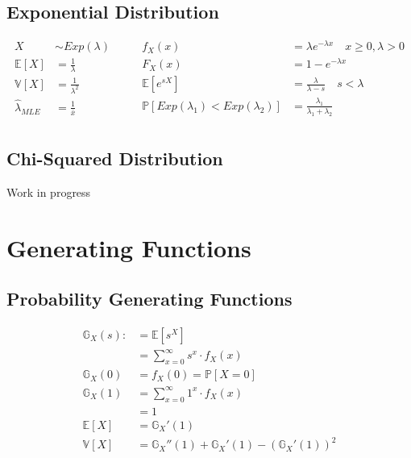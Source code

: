 \documentclass[12pt]{article}
\begin{document}
    \subsection{Exponential Distribution}
    \begin{equation*}
        \begin{aligned}
            X &\sim Exp(\lambda) \qquad\\
            \mathbb{E}[X] &= \frac{1}{\lambda} \\
            \mathbb{V}[X] &= \frac{1}{\lambda^2} \\
            \hat{\lambda}_{MLE} &= \frac{1}{\bar{x}} \\
        \end{aligned}
        \begin{aligned}
            f_X(x) &= \lambda e^{-\lambda x} \quad x \ge 0, \lambda > 0 \\
            F_X(x) &= 1 - e^{-\lambda x} \\
            \mathbb{E}[e^{sX}] &= \frac{\lambda}{\lambda - s} \quad s < \lambda \\
            \mathbb{P}[Exp(\lambda_1) < Exp(\lambda_2)] &= \frac{\lambda_1}{\lambda_1 + \lambda_2}\\
        \end{aligned}
    \end{equation*}

    \subsection{Chi-Squared Distribution}
    Work in progress
\section{Generating Functions}
    \subsection{Probability Generating Functions}
    \begin{equation*}
        \begin{aligned}
            \mathbb{G}_X(s) :&= \mathbb{E}[s^X] \\
            &= \sum_{x = 0}^\infty s^x \cdot f_X(x) \\
            \mathbb{G}_X(0)  &= f_X(0) = \mathbb{P}[X=0] \\
            \mathbb{G}_X(1)  &= \sum_{x = 0}^\infty 1^x \cdot f_X(x) \\
            &= 1 \\
            \mathbb{E}[X] &= \mathbb{G}_X'(1)  \\
            \mathbb{V}[X] &= \mathbb{G}_X''(1) + \mathbb{G}_X'(1) - \left(\mathbb{G}_X'(1)\right)^2 \\
        \end{aligned}
    \end{equation*}
\end{document}

